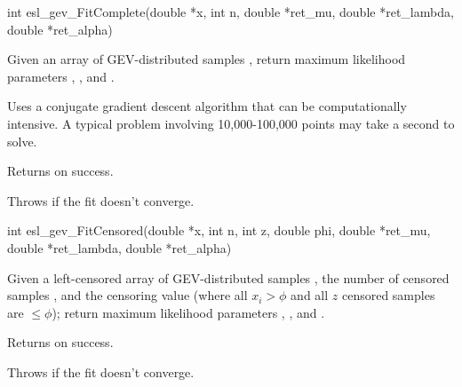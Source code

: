 \begin{sreapi}
\hypertarget{func:esl_gev_FitComplete()}
{\item[int esl\_gev\_FitComplete(double *x, int n, 
		    double *ret\_mu, double *ret\_lambda, double *ret\_alpha)]}

Given an array of  GEV-distributed samples \ccode{x[0]..x[n-1},
return maximum likelihood parameters , 
, and .

Uses a conjugate gradient descent algorithm that
can be computationally intensive. A typical problem
involving 10,000-100,000 points may take a second 
to solve.

Returns  on success.

Throws  if the fit doesn't converge.



\hypertarget{func:esl_gev_FitCensored()}
{\item[int esl\_gev\_FitCensored(double *x, int n, int z, double phi,
		    double *ret\_mu, double *ret\_lambda, double *ret\_alpha)]}

Given a left-censored array of  GEV-distributed samples
\ccode{x[0]..x[n-1}, the number of censored samples , and
the censoring value  (where all $x_i > \phi$ and
all $z$ censored samples are $\leq \phi$);
return maximum likelihood parameters , 
, and .

Returns  on success.

Throws  if the fit doesn't converge.



\end{sreapi}

